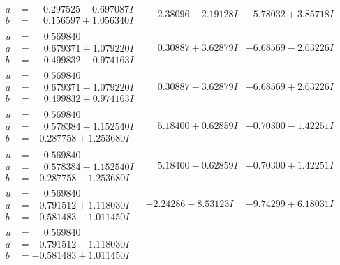 \documentclass[1p]{elsarticle_modified}
\theoremstyle{definition}
\begin{document}
$$\begin{array}{c|c|c}
\begin{aligned}
a &= \phantom{-}0.297525 - 0.697087 I \\
b &= \phantom{-}0.156597 + 1.056340 I\end{aligned}
 & \phantom{-}2.38096 - 2.19128 I & -5.78032 + 3.85718 I \\ \hline\begin{aligned}
u &= \phantom{-}0.569840\phantom{ +0.000000I} \\
a &= \phantom{-}0.679371 + 1.079220 I \\
b &= \phantom{-}0.499832 - 0.974163 I\end{aligned}
 & \phantom{-}0.30887 + 3.62879 I & -6.68569 - 2.63226 I \\ \hline\begin{aligned}
u &= \phantom{-}0.569840\phantom{ +0.000000I} \\
a &= \phantom{-}0.679371 - 1.079220 I \\
b &= \phantom{-}0.499832 + 0.974163 I\end{aligned}
 & \phantom{-}0.30887 - 3.62879 I & -6.68569 + 2.63226 I \\ \hline\begin{aligned}
u &= \phantom{-}0.569840\phantom{ +0.000000I} \\
a &= \phantom{-}0.578384 + 1.152540 I \\
b &= -0.287758 + 1.253680 I\end{aligned}
 & \phantom{-}5.18400 + 0.62859 I & -0.70300 - 1.42251 I \\ \hline\begin{aligned}
u &= \phantom{-}0.569840\phantom{ +0.000000I} \\
a &= \phantom{-}0.578384 - 1.152540 I \\
b &= -0.287758 - 1.253680 I\end{aligned}
 & \phantom{-}5.18400 - 0.62859 I & -0.70300 + 1.42251 I \\ \hline\begin{aligned}
u &= \phantom{-}0.569840\phantom{ +0.000000I} \\
a &= -0.791512 + 1.118030 I \\
b &= -0.581483 - 1.011450 I\end{aligned}
 & -2.24286 - 8.53123 I & -9.74299 + 6.18031 I \\ \hline\begin{aligned}
u &= \phantom{-}0.569840\phantom{ +0.000000I} \\
a &= -0.791512 - 1.118030 I \\
b &= -0.581483 + 1.011450 I\end{aligned}

\end{array}$$
\end{document}
